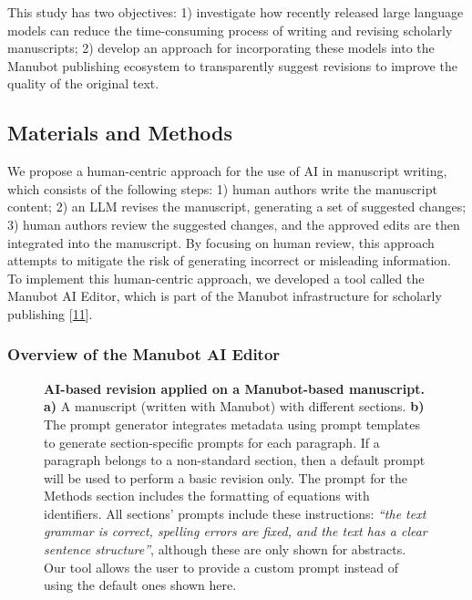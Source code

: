\documentclass[
]{article}
\begin{document}
This study has two objectives:
1) investigate how recently released large language models can reduce the time-consuming process of writing and revising scholarly manuscripts;
2) develop an approach for incorporating these models into the Manubot publishing ecosystem to transparently suggest revisions to improve the quality of the original text.

\subsection{Materials and Methods}

We propose a human-centric approach for the use of AI in manuscript writing, which consists of the following steps:
1) human authors write the manuscript content;
2) an LLM revises the manuscript, generating a set of suggested changes;
3) human authors review the suggested changes, and the approved edits are then integrated into the manuscript.
By focusing on human review, this approach attempts to mitigate the risk of generating incorrect or misleading information.
To implement this human-centric approach, we developed a tool called the Manubot AI Editor, which is part of the Manubot infrastructure for scholarly publishing {[}\protect\hyperlink{ref-YuJbg3zO}{11}{]}.

\subsubsection{Overview of the Manubot AI Editor}

\begin{figure}
\hypertarget{fig:ai_revision}{%
\centering

\caption{\textbf{AI-based revision applied on a Manubot-based manuscript.}
\textbf{a)} A manuscript (written with Manubot) with different sections.
\textbf{b)} The prompt generator integrates metadata using prompt templates to generate section-specific prompts for each paragraph.
If a paragraph belongs to a non-standard section, then a default prompt will be used to perform a basic revision only.
The prompt for the Methods section includes the formatting of equations with identifiers.
All sections' prompts include these instructions: \emph{``the text grammar is correct, spelling errors are fixed, and the text has a clear sentence structure''}, although these are only shown for abstracts.
Our tool allows the user to provide a custom prompt instead of using the default ones shown here.}\label{fig:ai_revision}
}
\end{figure}
\end{document}
